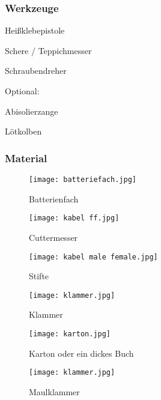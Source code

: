 
\subsubsection{Werkzeuge}
\begin{checklist}
    \item Heißklebepistole
    \item Schere / Teppichmesser
    \item Schraubendreher

    \begin{checklist}
    \item[] Optional:
    \item Abisolierzange
    \item Lötkolben
    \end{checklist}
\end{checklist}

\subsubsection{Material}


\begin{figure}[h]
\centering
\parbox{5cm}{
\texttt{[image: batteriefach.jpg]}
\caption*{Batterienfach}
}
\qquad
\begin{minipage}{5cm}
\texttt{[image: kabel ff.jpg]}
\caption*{Cuttermesser}
\end{minipage}
\end{figure}


\begin{figure}[h]
\centering
\parbox{5cm}{
\texttt{[image: kabel male female.jpg]}
\caption*{Stifte}
}
\qquad
\begin{minipage}{5cm}
\texttt{[image: klammer.jpg]}
\caption*{Klammer}
\end{minipage}
\end{figure}


\begin{figure}[h]
\centering
\parbox{5cm}{
\texttt{[image: karton.jpg]}
\caption*{Karton oder ein dickes Buch}
}
\qquad
\begin{minipage}{5cm}
\texttt{[image: klammer.jpg]}
\caption*{Maulklammer}
\end{minipage}
\end{figure}

